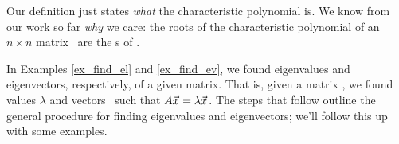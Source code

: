 
Our definition just states \textit{what} the characteristic polynomial is. We know from our work so far \textit{why} we care: the roots of the characteristic polynomial of an $n\times n$ matrix \tta\ are the \el s of \tta.

In Examples \ref{ex_find_el} and \ref{ex_find_ev}, we found eigenvalues and eigenvectors, respectively, of a given matrix. That is, given a matrix \tta, we found values $\lambda$ and vectors \vx\ such that $A\vec{x_{}} = \lambda\vec{x_{}}$. The steps that follow outline the general procedure for finding eigenvalues and eigenvectors; we'll follow this up with some examples.


